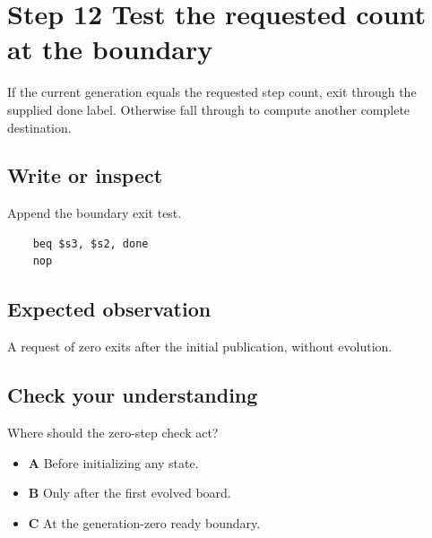 \section{Step 12 Test the requested count at the
  boundary}\label{008-life-generations-s12-step-12-test-the-requested-count-at-the-boundary}

If the current generation equals the requested step count, exit through
the supplied done label. Otherwise fall through to compute another
complete destination.

\subsection{Write or
  inspect}\label{008-life-generations-s12-write-or-inspect}

Append the boundary exit test.

\begin{verbatim}
    beq $s3, $s2, done
    nop
\end{verbatim}

\subsection{Expected
  observation}\label{008-life-generations-s12-expected-observation}

A request of zero exits after the initial publication, without
evolution.

\subsection{Check your
  understanding}\label{008-life-generations-s12-check-your-understanding}

Where should the zero-step check act?

\begin{itemize}
  \tightlist
  \item
        \textbf{A} Before initializing any state.
  \item
        \textbf{B} Only after the first evolved board.
  \item
        \textbf{C} At the generation-zero ready boundary.
\end{itemize}
